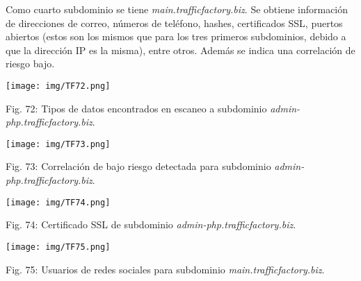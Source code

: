 \documentclass[12pt,oneside,a4paper]{book}
\begin{document}
\vspace{2em}

\hspace{20pt}
Como cuarto subdominio se tiene \textit{main.trafficfactory.biz}. Se obtiene información de direcciones de correo, números de teléfono, hashes, certificados SSL, puertos abiertos (estos son los mismos que para los tres primeros subdominios, debido a que la dirección IP es la misma), entre otros. Además se indica una correlación de riesgo bajo.

\vspace{2em}

\begin{center}
	\texttt{[image: img/TF72.png]}
    
\vspace{0.1em}
    
    Fig. 72: Tipos de datos encontrados en escaneo a subdominio \textit{admin-php.trafficfactory.biz}.
\end{center}

\vspace{2em}

\begin{center}
	\texttt{[image: img/TF73.png]}
    
\vspace{0.1em}
    
    Fig. 73: Correlación de bajo riesgo detectada para subdominio \textit{admin-php.trafficfactory.biz}.
\end{center}

\vspace{2em}

\begin{center}
	\texttt{[image: img/TF74.png]}
    
\vspace{0.1em}
    
    Fig. 74: Certificado SSL de subdominio \textit{admin-php.trafficfactory.biz}.
\end{center}

\newpage

\begin{center}
	\texttt{[image: img/TF75.png]}
    
\vspace{0.1em}
    
    Fig. 75: Usuarios de redes sociales para subdominio \textit{main.trafficfactory.biz}.
\end{center}

\vspace{2em}
\end{document}
